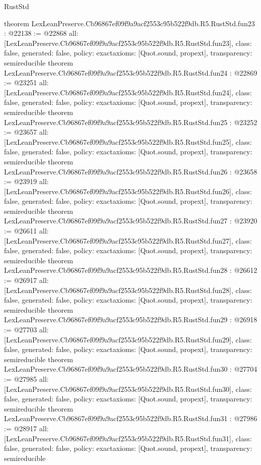 \begin{lexlean}{RustStd}
\begin{coremodule}
{}
theorem LexLeanPreserve.Cb96867ef09f9a9acf2553c95b522f9db.R5.RustStd.fun23 : @22138 := @22868 {
  all: [LexLeanPreserve.Cb96867ef09f9a9acf2553c95b522f9db.R5.RustStd.fun23],
  class: false,
  generated: false,
  policy: exact{axioms: [Quot.sound, propext]},
  transparency: semireducible
}
theorem LexLeanPreserve.Cb96867ef09f9a9acf2553c95b522f9db.R5.RustStd.fun24 : @22869 := @23251 {
  all: [LexLeanPreserve.Cb96867ef09f9a9acf2553c95b522f9db.R5.RustStd.fun24],
  class: false,
  generated: false,
  policy: exact{axioms: [Quot.sound, propext]},
  transparency: semireducible
}
theorem LexLeanPreserve.Cb96867ef09f9a9acf2553c95b522f9db.R5.RustStd.fun25 : @23252 := @23657 {
  all: [LexLeanPreserve.Cb96867ef09f9a9acf2553c95b522f9db.R5.RustStd.fun25],
  class: false,
  generated: false,
  policy: exact{axioms: [Quot.sound, propext]},
  transparency: semireducible
}
theorem LexLeanPreserve.Cb96867ef09f9a9acf2553c95b522f9db.R5.RustStd.fun26 : @23658 := @23919 {
  all: [LexLeanPreserve.Cb96867ef09f9a9acf2553c95b522f9db.R5.RustStd.fun26],
  class: false,
  generated: false,
  policy: exact{axioms: [Quot.sound, propext]},
  transparency: semireducible
}
theorem LexLeanPreserve.Cb96867ef09f9a9acf2553c95b522f9db.R5.RustStd.fun27 : @23920 := @26611 {
  all: [LexLeanPreserve.Cb96867ef09f9a9acf2553c95b522f9db.R5.RustStd.fun27],
  class: false,
  generated: false,
  policy: exact{axioms: [Quot.sound, propext]},
  transparency: semireducible
}
theorem LexLeanPreserve.Cb96867ef09f9a9acf2553c95b522f9db.R5.RustStd.fun28 : @26612 := @26917 {
  all: [LexLeanPreserve.Cb96867ef09f9a9acf2553c95b522f9db.R5.RustStd.fun28],
  class: false,
  generated: false,
  policy: exact{axioms: [Quot.sound, propext]},
  transparency: semireducible
}
theorem LexLeanPreserve.Cb96867ef09f9a9acf2553c95b522f9db.R5.RustStd.fun29 : @26918 := @27703 {
  all: [LexLeanPreserve.Cb96867ef09f9a9acf2553c95b522f9db.R5.RustStd.fun29],
  class: false,
  generated: false,
  policy: exact{axioms: [Quot.sound, propext]},
  transparency: semireducible
}
theorem LexLeanPreserve.Cb96867ef09f9a9acf2553c95b522f9db.R5.RustStd.fun30 : @27704 := @27985 {
  all: [LexLeanPreserve.Cb96867ef09f9a9acf2553c95b522f9db.R5.RustStd.fun30],
  class: false,
  generated: false,
  policy: exact{axioms: [Quot.sound, propext]},
  transparency: semireducible
}
theorem LexLeanPreserve.Cb96867ef09f9a9acf2553c95b522f9db.R5.RustStd.fun31 : @27986 := @28917 {
  all: [LexLeanPreserve.Cb96867ef09f9a9acf2553c95b522f9db.R5.RustStd.fun31],
  class: false,
  generated: false,
  policy: exact{axioms: [Quot.sound, propext]},
  transparency: semireducible
}
\end{coremodule}
\end{lexlean}
